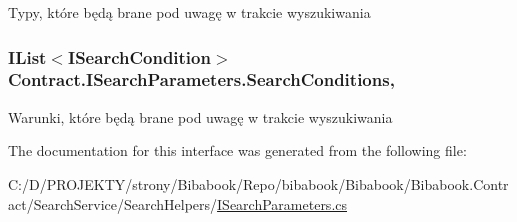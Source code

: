 Typy, które będą brane pod uwagę w trakcie wyszukiwania 

\hypertarget{interface_contract_1_1_i_search_parameters_a762fa2e5b252e1c1f6bc80a3c48c46be}{}
\subsubsection[{Search\+Conditions}]{\setlength{\rightskip}{0pt plus 5cm}I\+List$<${\bf I\+Search\+Condition}$>$ Contract.\+I\+Search\+Parameters.\+Search\+Conditions\hspace{0.3cm}{\ttfamily [get]}, {\ttfamily [set]}}\label{interface_contract_1_1_i_search_parameters_a762fa2e5b252e1c1f6bc80a3c48c46be}


Warunki, które będą brane pod uwagę w trakcie wyszukiwania 



The documentation for this interface was generated from the following file\+:\begin{DoxyCompactItemize}
\item 
C\+:/\+D/\+P\+R\+O\+J\+E\+K\+T\+Y/strony/\+Bibabook/\+Repo/bibabook/\+Bibabook/\+Bibabook.\+Contract/\+Search\+Service/\+Search\+Helpers/\hyperlink{_i_search_parameters_8cs}{I\+Search\+Parameters.\+cs}\end{DoxyCompactItemize}
